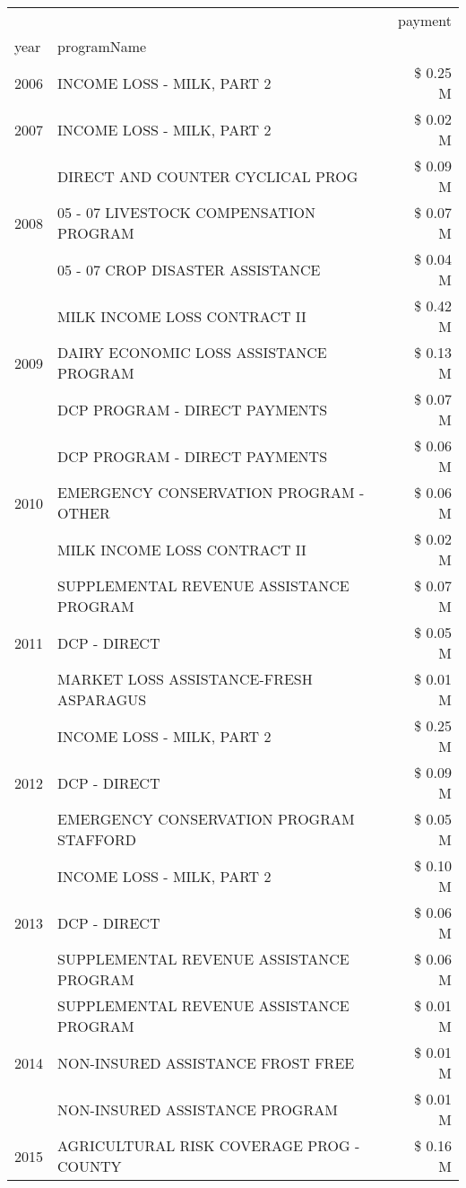 \begin{tabular}{llr}
\toprule
 &  & payment \\
year & programName &  \\
\midrule
2006 & INCOME LOSS - MILK, PART 2 & \$ 0.25 M \\
\cline{1-3}
2007 & INCOME LOSS - MILK, PART 2 & \$ 0.02 M \\
\cline{1-3}
\multirow[t]{3}{*}{2008} & DIRECT AND COUNTER CYCLICAL PROG & \$ 0.09 M \\
 & 05 - 07 LIVESTOCK COMPENSATION PROGRAM & \$ 0.07 M \\
 & 05 - 07 CROP DISASTER ASSISTANCE & \$ 0.04 M \\
\cline{1-3}
\multirow[t]{3}{*}{2009} & MILK INCOME LOSS CONTRACT II & \$ 0.42 M \\
 & DAIRY ECONOMIC LOSS ASSISTANCE PROGRAM & \$ 0.13 M \\
 & DCP PROGRAM - DIRECT PAYMENTS & \$ 0.07 M \\
\cline{1-3}
\multirow[t]{3}{*}{2010} & DCP PROGRAM - DIRECT PAYMENTS & \$ 0.06 M \\
 & EMERGENCY CONSERVATION PROGRAM - OTHER & \$ 0.06 M \\
 & MILK INCOME LOSS CONTRACT II & \$ 0.02 M \\
\cline{1-3}
\multirow[t]{3}{*}{2011} & SUPPLEMENTAL REVENUE ASSISTANCE PROGRAM & \$ 0.07 M \\
 & DCP - DIRECT & \$ 0.05 M \\
 & MARKET LOSS ASSISTANCE-FRESH ASPARAGUS & \$ 0.01 M \\
\cline{1-3}
\multirow[t]{3}{*}{2012} & INCOME LOSS - MILK, PART 2 & \$ 0.25 M \\
 & DCP - DIRECT & \$ 0.09 M \\
 & EMERGENCY CONSERVATION PROGRAM STAFFORD & \$ 0.05 M \\
\cline{1-3}
\multirow[t]{3}{*}{2013} & INCOME LOSS - MILK, PART 2 & \$ 0.10 M \\
 & DCP - DIRECT & \$ 0.06 M \\
 & SUPPLEMENTAL REVENUE ASSISTANCE PROGRAM & \$ 0.06 M \\
\cline{1-3}
\multirow[t]{3}{*}{2014} & SUPPLEMENTAL REVENUE ASSISTANCE PROGRAM & \$ 0.01 M \\
 & NON-INSURED ASSISTANCE FROST FREE & \$ 0.01 M \\
 & NON-INSURED ASSISTANCE PROGRAM & \$ 0.01 M \\
\cline{1-3}
\multirow[t]{2}{*}{2015} & AGRICULTURAL RISK COVERAGE PROG - COUNTY & \$ 0.16 M \\

\end{tabular}
